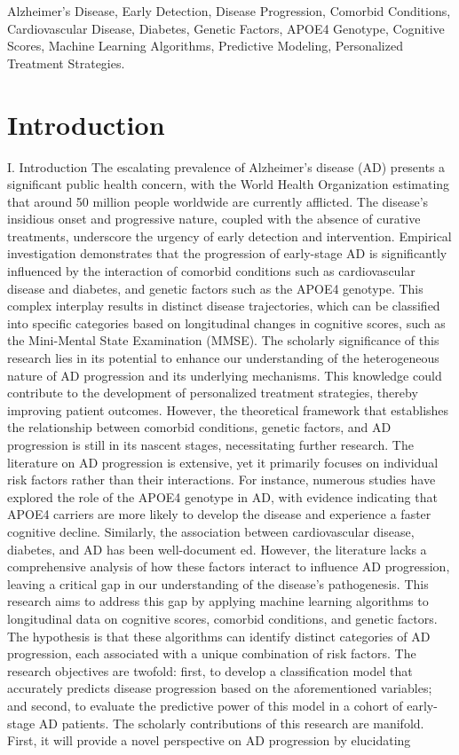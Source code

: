 \documentclass[conference]{IEEEtran}
\begin{document}
\begin{IEEEkeywords}
Alzheimer's Disease, Early Detection, Disease Progression, Comorbid Conditions, Cardiovascular Disease, Diabetes, Genetic Factors, APOE4 Genotype, Cognitive Scores, Machine Learning Algorithms, Predictive Modeling, Personalized Treatment Strategies.
\end{IEEEkeywords}

\section{Introduction}
I. Introduction The escalating prevalence of Alzheimer's disease (AD) presents a significant public health concern, with the World Health Organization estimating that around 50 million people worldwide are currently afflicted. The disease's insidious onset and progressive nature, coupled with the absence of curative treatments, underscore the urgency of early detection and intervention. Empirical investigation demonstrates that the progression of early-stage AD is significantly influenced by the interaction of comorbid conditions such as cardiovascular disease and diabetes, and genetic factors such as the APOE4 genotype. This complex interplay results in distinct disease trajectories, which can be classified into specific categories based on longitudinal changes in cognitive scores, such as the Mini-Mental State Examination (MMSE). The scholarly significance of this research lies in its potential to enhance our understanding of the heterogeneous nature of AD progression and its underlying mechanisms. This knowledge could contribute to the development of personalized treatment strategies, thereby improving patient outcomes. However, the theoretical framework that establishes the relationship between comorbid conditions, genetic factors, and AD progression is still in its nascent stages, necessitating further research. The literature on AD progression is extensive, yet it primarily focuses on individual risk factors rather than their interactions. For instance, numerous studies have explored the role of the APOE4 genotype in AD, with evidence indicating that APOE4 carriers are more likely to develop the disease and experience a faster cognitive decline. Similarly, the association between cardiovascular disease, diabetes, and AD has been well-document ed. However, the literature lacks a comprehensive analysis of how these factors interact to influence AD progression, leaving a critical gap in our understanding of the disease's pathogenesis. This research aims to address this gap by applying machine learning algorithms to longitudinal data on cognitive scores, comorbid conditions, and genetic factors. The hypothesis is that these algorithms can identify distinct categories of AD progression, each associated with a unique combination of risk factors. The research objectives are twofold: first, to develop a classification model that accurately predicts disease progression based on the aforementioned variables; and second, to evaluate the predictive power of this model in a cohort of early-stage AD patients. The scholarly contributions of this research are manifold. First, it will provide a novel perspective on AD progression by elucidating 
\end{document}
